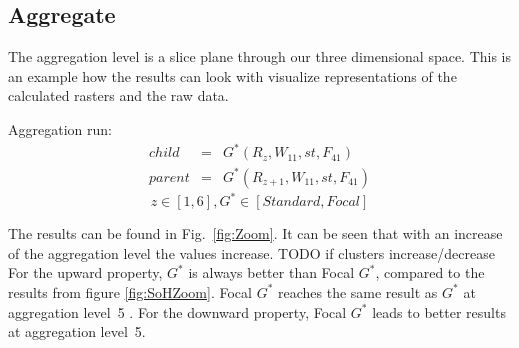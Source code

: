 \documentclass{itatnew}
\begin{document}
\subsection{Aggregate}

The aggregation level is a slice plane through our three dimensional space. 
This is an example how the results can look with visualize representations of the calculated 
rasters and the raw data.
\begin{definition} Aggregation run:
\begin{eqnarray*}
    child & = & G^*(R_z, W_{11}, st, F_{41}) \\
    parent & = & G^*(R_{z+1}, W_{11}, st, F_{41})
  \end{eqnarray*}
\begin{displaymath}
z \in [1,6], G^* \in [Standard, Focal]
\end{displaymath}
\end{definition}

The results can be found in Fig.~\ref{fig:Zoom}. It can be seen that with an
increase of the aggregation level the values increase. TODO if clusters
increase/decrease For the upward property, $G^*$ is always better than Focal
$G^*$, compared to the results from figure \ref{fig:SoHZoom}. Focal $G^*$
reaches the same result as $G^*$ at aggregation level~5 . For the downward
property, Focal $G^*$ leads to better results at aggregation level~5.
\end{document}
